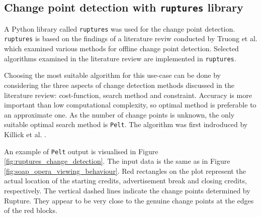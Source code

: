 \subsection{Change point detection with \texttt{ruptures} library} \label{subsec:solution}

A Python library called \texttt{ruptures} was used for the change point detection. \texttt{ruptures} is based on the findings of a literature reviw conducted by Truong et al. \cite{truongSelectiveReviewOffline2020} which examined various methods for offline change point detection. Selected algorithms examined in the literature review are implemented in \texttt{ruptures}.


Choosing the most suitable algorithm %
for this use-case can be done by considering the three aspects of change detection methods discussed in the literature review: cost-function, search method and constraint. Accuracy is more important than low computational complexity, so optimal method is preferable to an approximate one. As the number of change points is unknown, the only suitable optimal search method is \texttt{Pelt}. The algorithm was first indroduced by Killick et al. \cite{killickOptimalDetectionChangepoints2012}.

An example of \texttt{Pelt} output is visualised in Figure \ref{fig:ruptures_change_detection}. The input data is the same as in Figure \ref{fig:soap_opera_viewing_behaviour}. Red rectangles on the plot represent the actual location of the starting credits, advertisement break and closing credits, respectively. The vertical dashed lines indicate the change points determined by Rupture. They appear to be very close to the genuine change points at the edges of the red blocks.


